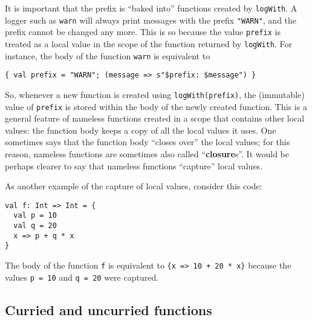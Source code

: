 It is important that the prefix is ``baked into'' functions created
by \lstinline!logWith!.
A logger such as \lstinline!warn!
will always print messages with the prefix \lstinline!"WARN"!,
and the prefix cannot be changed any more. This is so because the
value \lstinline!prefix!
is treated as a local value in the scope of the function returned
by \lstinline!logWith!.
For instance, the body of the function \lstinline!warn!
is equivalent to
\begin{lstlisting}
{ val prefix = "WARN"; (message => s"$prefix: $message") }
\end{lstlisting}
So, whenever a new function is created using \lstinline!logWith(prefix)!,
the (immutable) value of \lstinline!prefix!
is stored within the body of the newly created function. This is a
general feature of nameless functions created in a scope that contains
other local values: the function body keeps a copy of all the local
values it uses. One sometimes says that the function body ``closes
over'' the local values; for this reason, nameless functions are
sometimes also called ``\textbf{closure}s''. It
would be perhaps clearer to say that nameless functions ``capture''
local values.

As another example of the capture of local values, consider this code:
\begin{lstlisting}
val f: Int => Int = {
  val p = 10
  val q = 20
  x => p + q * x
}
\end{lstlisting}
The body of the function \lstinline!f!
is equivalent to \lstinline!{x => 10 + 20 * x}!
because the values \lstinline!p = 10!
and \lstinline!q = 20!
were captured.

\subsection{Curried and uncurried functions}

